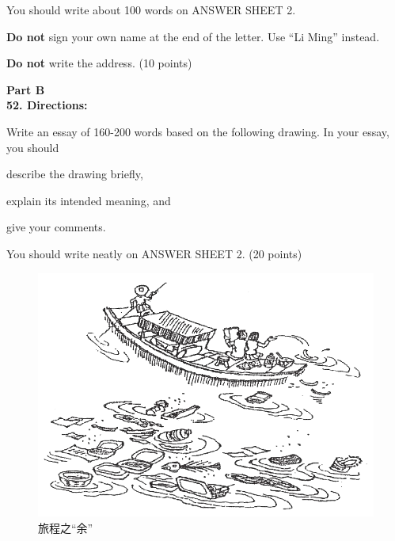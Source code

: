 You should write about 100 words on ANSWER SHEET 2.

\textbf{Do not} sign your own name at the end of the letter. Use ``Li
Ming'' instead.

\textbf{Do not} write the address. (10 points)



\vspace{2em}

\noindent
\textbf{Part B}\\
\textbf{52. Directions:}

Write an essay of 160-200 words based on the following drawing. In your
essay, you should
\begin{listwrite}
	\item
 describe the drawing briefly,

\item 
 explain its intended meaning, and

\item 
 give your comments.
\end{listwrite}

You should write neatly on ANSWER SHEET 2. (20 points)

\begin{figure}[h!]
	\centering
	\includegraphics[width=0.54\linewidth]{picture/2011.png}
	\caption*{旅程之“余”}
\end{figure}

\checkpagenumber